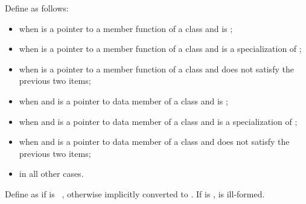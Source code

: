 \pnum
{}%
Define  as follows:
\begin{itemize}
\item {} when  is a pointer to a
member function of a class 
and  is ;

\item {} when  is a pointer to a
member function of a class 
and  is a specialization of ;

\item {} when  is a pointer to a
member function of a class 
and  does not satisfy the previous two items;

\item {} when  and  is a pointer to
data member of a class 
and  is ;

\item {} when  and  is a pointer to
data member of a class 
and  is a specialization of ;

\item {} when  and  is a pointer to
data member of a class 
and  does not satisfy the previous two items;

\item {} in all other cases.
\end{itemize}

\pnum
{}%
Define  as
if  is \cv{}~, otherwise
 implicitly converted
to .
If
is ,
is ill-formed.

